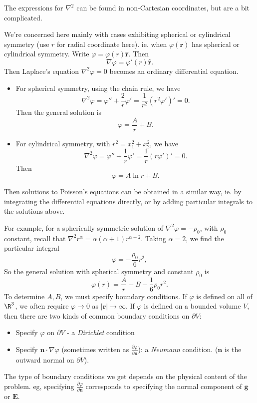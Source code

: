 \documentclass[a4paper]{article}
\begin{document}
The expressions for $\nabla^2$ can be found in non-Cartesian coordinates, but are a bit complicated.

We're concerned here mainly with cases exhibiting spherical or cylindrical symmetry (use $r$ for radial coordinate here). ie. when $\varphi(\mathbf{r})$ has spherical or cylindrical symmetry. Write $\varphi = \varphi(r) \hat{\mathbf{r}}$. Then
\[
  \nabla \varphi = \varphi'(r)\hat{\mathbf{r}}.
\]
Then Laplace's equation $\nabla^2 \varphi = 0$ becomes an ordinary differential equation.
\begin{itemize}
  \item For spherical symmetry, using the chain rule, we have
    \[
      \nabla^2 \varphi = \varphi'' + \frac{2}{r}\varphi' = \frac{1}{r^2}(r^2\varphi')' = 0.
    \]
    Then the general solution is
    \[
      \varphi = \frac{A}{r} + B.
    \]
  \item For cylindrical symmetry, with $r^2 = x_1^2 + x_2^2$, we have
    \[
      \nabla^2 \varphi = \varphi'' + \frac{1}{r}\varphi' = \frac{1}{r}(r\varphi')' = 0.
    \]
    Then
    \[
      \varphi = A\ln r + B.
    \]
\end{itemize}
Then solutions to Poisson's equations can be obtained in a similar way, ie. by integrating the differential equations directly, or by adding particular integrals to the solutions above.

For example, for a spherically symmetric solution of $\nabla^2 \varphi = -\rho_0$, with $\rho_0$ constant, recall that $\nabla^2 r^\alpha = \alpha(\alpha + 1)r^{\alpha - 2}$. Taking $\alpha = 2$, we find the particular integral
\[
  \varphi = -\frac{\rho_0}{6}r^2,
\]
So the general solution with spherical symmetry and constant $\rho_0$ is
\[
  \varphi(r) = \frac{A}{r} + B - \frac{1}{6}\rho_0 r^2.
\]
To determine $A, B$, we must specify boundary conditions. If $\varphi$ is defined on all of $\R^3$, we often require $\varphi \to 0$ as $|\mathbf{r}| \to \infty$. If $\varphi$ is defined on a bounded volume $V$, then there are two kinds of common boundary conditions on $\partial V$:
\begin{itemize}
  \item Specify $\varphi$ on $\partial V$ - a \emph{Dirichlet} condition
  \item Specify $\mathbf{n}\cdot \nabla \varphi$ (sometimes written as $\frac{\partial \varphi}{\partial \mathbf{n}}$): a \emph{Neumann} condition. ($\mathbf{n}$ is the outward normal on $\partial V$).
\end{itemize}
The type of boundary conditions we get depends on the physical content of the problem. eg, specifying $\frac{\partial \varphi}{\partial \mathbf{n}}$ corresponds to specifying the normal component of $\mathbf{g}$ or $\mathbf{E}$.
\end{document}
